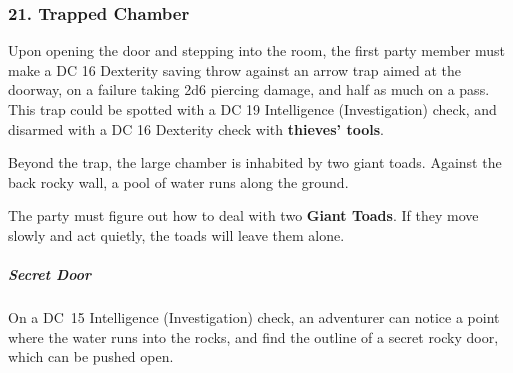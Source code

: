 \subsubsection{21. Trapped Chamber}
Upon opening the door and stepping into the room, the first party member must make a DC 16 Dexterity saving throw against an arrow trap aimed at the doorway, on a failure taking 2d6 piercing damage, and half as much on a pass. This trap could be spotted with a DC 19 Intelligence (Investigation) check, and disarmed with a DC 16 Dexterity check with \textbf{thieves' tools}.
\begin{DndReadAloud}
  Beyond the trap, the large chamber is inhabited by two giant toads. Against the back rocky wall, a pool of water runs along the ground.
\end{DndReadAloud}
The party must figure out how to deal with two \textbf{Giant Toads}. If they move slowly and act quietly, the toads will leave them alone.
\subparagraph{Secret Door}On a DC~15 Intelligence (Investigation) check, an adventurer can notice a point where the water runs into the rocks, and find the outline of a secret rocky door, which can be pushed open.
